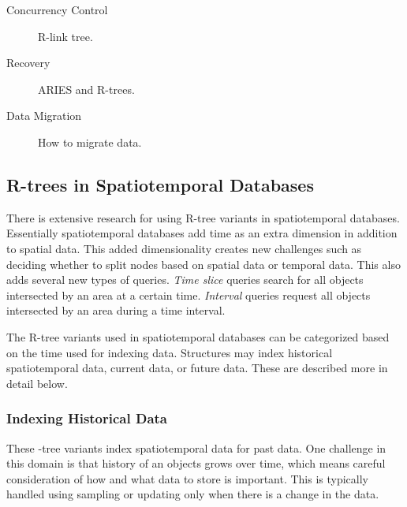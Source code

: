 \begin{description}
	\item[Concurrency Control] R-link tree.
	\item[Recovery] ARIES and R-trees.
	\item[Data Migration] How to migrate data.
\end{description}

\subsection{R-trees in Spatiotemporal Databases}
There is extensive research for using R-tree variants in spatiotemporal
databases. Essentially spatiotemporal databases add time as an extra dimension
in addition to spatial data. This added dimensionality creates new challenges
such as deciding whether to split nodes based on spatial data or temporal data. 
This also adds several new types of queries. \emph{Time slice}
queries search for all objects intersected by an area at a certain time. 
\emph{Interval} queries request all objects intersected by an area during a time
interval.

The R-tree variants used in spatiotemporal databases can be categorized based
on the time used for indexing data. Structures may index historical 
spatiotemporal data, current data, or future data. These are described more
in detail below.

\subsubsection{Indexing Historical Data}
These \rbase-tree variants index spatiotemporal data for past data. One challenge
in this domain is that history of an objects grows over time, which means 
careful consideration of how and what data to store is important. This is 
typically handled using sampling or updating only when there is a change in the
data. 

